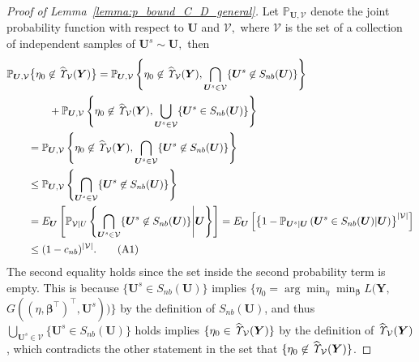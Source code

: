 \documentclass[12pt]{article}
\theoremstyle{shortspace}
\def\*#1{\bm{#1}}
\def\P{\mathbb P}
\newcommand\numberthis{\addtocounter{equation}{1}\tag{\theequation}}
\begin{document}
\begin{proof}[Proof of Lemma~\ref{lemma:p_bound_C_D_general}]
Let $\P_{\*U, \mathcal V}$ denote the joint probability function with respect to $\*U$ and $\mathcal V,$ where $\mathcal V$  is the set of a collection of independent samples of $\*U^s \sim \*U,$ 
then
\begin{align*} 
& \P_{\*U, \mathcal V}\big\{\eta_0 \not\in \widehat{\it \Upsilon}_{{\mathcal V}}(\*Y)\big\}  = \P_{\*U, \mathcal V}\left\{\eta_0 \not\in \widehat{\it \Upsilon}_{{\mathcal V}}(\*Y), \bigcap_{\*U^s \in \mathcal V}\{\*U^s \not\in S_{nb}(\*U)\}\right\} \\ & \qquad \qquad  
 +  \P_{\*U, \mathcal V}\left\{\eta_0 \not\in \widehat{\it \Upsilon}_{{\mathcal V}}(\*Y), \bigcup_{\*U^s \in \mathcal V}\{\*U^s \in S_{nb}(\*U)\}\right\}\\ & \qquad   = \P_{\*U, \mathcal V}\left\{\eta_0 \not\in \widehat{\it \Upsilon}_{{\mathcal V}}(\*Y), \bigcap_{\*U^s \in \mathcal V}\{\*U^s \not\in S_{nb}(\*U)\}\right\} \\
& \qquad \leq \P_{\*U, \mathcal V}\left\{ \bigcap_{\*U^s \in \mathcal V}\{\*U^s \not\in S_{nb}(\*U)\}\right\}\\
& \qquad = E_{\*U}\left[\P_{\mathcal V|U}\left\{\bigcap_{\*U^s \in \mathcal V}\{\*U^s \not\in S_{nb}(\*U)\}\middle |\*U\right\}\right] =  E_{\*U}\left[\left\{1- \P_{\*U^s|\*U}\left(\*U^s \in S_{nb}(\*U)\middle |\*U\right)\right\}^{|\mathcal V|}\right]\\
&\qquad  \leq (1-c_{nb})^{|\mathcal V|}.
\numberthis \label{eq: 1-P_delta}
\end{align*}
The second equality holds since the set inside the second probability term is empty.  This is because 
$\{\*U^s \in S_{nb}(\*U)\}$ implies $ \{\eta_0 = \arg \min\nolimits_{\eta} \min\nolimits_{\*\beta}L\big(\*Y, $ $G((\eta, \*\beta^\top)^\top, \*U^s)\big)
\}$
by the definition of $S_{nb}(\*U)$, and thus  $\bigcup_{\*U^s \in \mathcal V}\{\*U^s \in S_{nb}(\*U)\}$ holds implies $\{\eta_0 \in  \widehat{\it \Upsilon}_{{\mathcal V}}(\*Y)
\}$ by the definition of $\widehat{\it \Upsilon}_{{\mathcal V}}(\*Y)$, which contradicts the other statement in the set that $\{\eta_0 \not\in  \widehat{\it \Upsilon}_{{\mathcal V}}(\*Y)
\}$. 
\end{proof}
\end{document}
